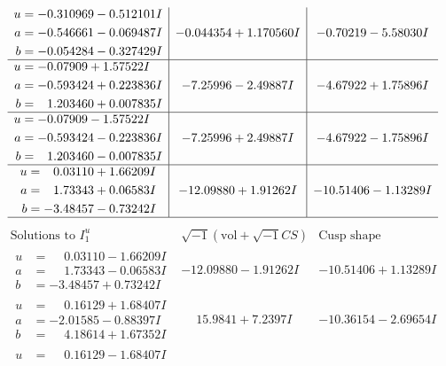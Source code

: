 \documentclass[1p]{elsarticle_modified}
\theoremstyle{definition}
\newcommand{\I}{\sqrt{-1}}
\begin{document}
$$\begin{array}{c|c|c}
\begin{aligned}
u &= -0.310969 - 0.512101 I \\
a &= -0.546661 - 0.069487 I \\
b &= -0.054284 - 0.327429 I\end{aligned}
 & -0.044354 + 1.170560 I & -0.70219 - 5.58030 I \\ \hline\begin{aligned}
u &= -0.07909 + 1.57522 I \\
a &= -0.593424 + 0.223836 I \\
b &= \phantom{-}1.203460 + 0.007835 I\end{aligned}
 & -7.25996 - 2.49887 I & -4.67922 + 1.75896 I \\ \hline\begin{aligned}
u &= -0.07909 - 1.57522 I \\
a &= -0.593424 - 0.223836 I \\
b &= \phantom{-}1.203460 - 0.007835 I\end{aligned}
 & -7.25996 + 2.49887 I & -4.67922 - 1.75896 I \\ \hline\begin{aligned}
u &= \phantom{-}0.03110 + 1.66209 I \\
a &= \phantom{-}1.73343 + 0.06583 I \\
b &= -3.48457 - 0.73242 I\end{aligned}
 & -12.09880 + 1.91262 I & -10.51406 - 1.13289 I\\
 \hline 
 \end{array}$$\newpage$$\begin{array}{c|c|c}  
\text{Solutions to }I^u_{1}& \I (\text{vol} + \sqrt{-1}CS) & \text{Cusp shape}\\
 \hline 
\begin{aligned}
u &= \phantom{-}0.03110 - 1.66209 I \\
a &= \phantom{-}1.73343 - 0.06583 I \\
b &= -3.48457 + 0.73242 I\end{aligned}
 & -12.09880 - 1.91262 I & -10.51406 + 1.13289 I \\ \hline\begin{aligned}
u &= \phantom{-}0.16129 + 1.68407 I \\
a &= -2.01585 - 0.88397 I \\
b &= \phantom{-}4.18614 + 1.67352 I\end{aligned}
 & \phantom{-}15.9841 + 7.2397 I & -10.36154 - 2.69654 I \\ \hline\begin{aligned}
u &= \phantom{-}0.16129 - 1.68407 I \\

\end{aligned}
\end{array}$$
\end{document}
